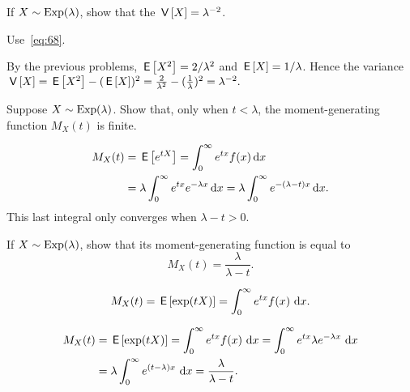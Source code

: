 \documentclass[companion]{subfiles}
\begin{document}
\begin{extra}
 If $X\sim\operatorname{Exp}(\lambda)$, show that the 
$\,\mathsf{V}\left[X\right] = \lambda^{-2}$.
\begin{hint} Use~\cref{eq:68}. 
\end{hint}
\begin{solution}
 By the previous problems, $\,\mathsf{E}\left[X^2\right]=2/\lambda^2$ and $\,\mathsf{E}\left[X\right] = 1/\lambda$. Hence the variance $\,\mathsf{V}\left[X\right] = \,\mathsf{E}\left[X^2\right] - (\,\mathsf{E}\left[X\right])^2 = \frac{2}{\lambda^2} - (\frac{1}{\lambda})^2 = \lambda^{-2}.$
\end{solution}
\end{extra}


\begin{extra}
 Suppose $X\sim\operatorname{Exp}(\lambda)$. Show that, only when $t < \lambda$, the moment-generating function $M_X(t)$ is finite.
\begin{solution} 
  \begin{align*}
    M_X(t) &= \,\mathsf{E}\left[e^{t X}\right] = \int_0^\infty e^{t x} f(x) \,\text{d}x \\
    &= \lambda \int_0^\infty e^{t x} e^{-\lambda x} \,\text{d}x = \lambda \int_0^\infty  e^{-(\lambda -t) x} \,\text{d}x.
  \end{align*}
This last integral only converges when $\lambda -t > 0$. 
\end{solution}
\end{extra}

\begin{extra}
 If $X\sim\operatorname{Exp}(\lambda)$, show that its moment-generating function is equal to
 \begin{equation*}
 M_X(t) = \frac{\lambda}{\lambda-t}.
 \end{equation*}
\begin{hint}
 \begin{equation*}
 M_X(t) = \,\mathsf{E}\left[\exp(t X)\right] =\int_0^\infty e^{t x} f(x) \,\,\text{d}x.
\end{equation*}
\end{hint}
\begin{solution}
 \begin{align*}
 M_X(t) &= \,\mathsf{E}\left[\exp(t X)\right] 
=\int_0^\infty e^{tx} f(x) \,\,\text{d}x 
=\int_0^\infty e^{tx} \lambda e^{-\lambda x} \,\,\text{d}x \\
&=\lambda \int_0^\infty e^{(t-\lambda)x} \,\,\text{d}x 
=\frac{\lambda}{\lambda -t}.
 \end{align*}
\end{solution}
\end{extra}
\end{document}
